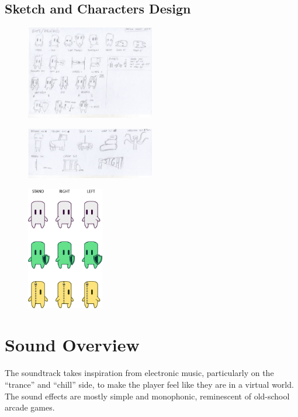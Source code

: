\documentclass[12pt, a4paper]{report}
\begin{document}
\section*{Sketch and Characters Design}
\begin{figure}[H]
	\centering
	\includegraphics[width=0.5\textwidth]{images/Characters}
\end{figure}
	\begin{figure}[H]
	\centering
	\includegraphics[width=0.5\textwidth]{images/Enemy}
\end{figure}
	\begin{figure}[H]
	\centering
	\includegraphics[width=0.3\textwidth]{images/Bits}
\end{figure}


\chapter{Sound Overview}
The soundtrack takes inspiration from electronic music, particularly on the “trance” and “chill” side, to make the player feel like they are in a virtual world.
The sound effects are mostly simple and monophonic, reminescent of old-school arcade games.\\
\end{document}

